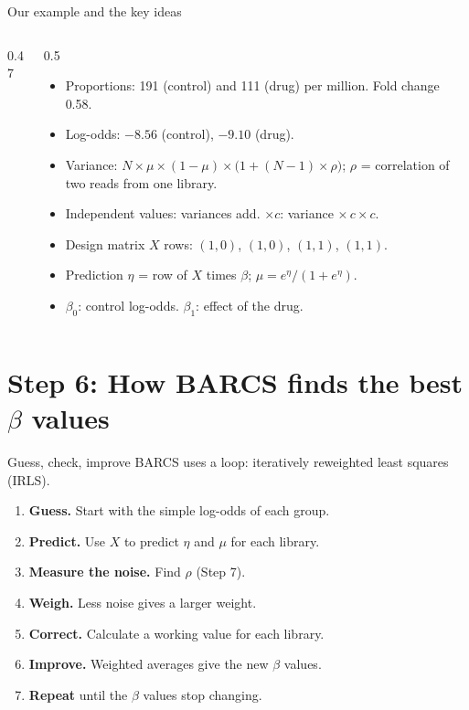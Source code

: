 \documentclass[aspectratio=169,11pt]{beamer}
\begin{document}
\begin{frame}{Our example and the key ideas}
\begin{columns}[T]
\begin{column}{0.47\textwidth}
\centering
\resizebox{\linewidth}{!}{\datatable}
\end{column}
\begin{column}{0.5\textwidth}
\footnotesize
\begin{itemize}
\item Proportions: 191 (control) and 111 (drug) per million. Fold change
  0.58.
\item Log-odds: $-8.56$ (control), $-9.10$ (drug).
\item Variance: $N \times \mu \times (1-\mu) \times \bigl(1 + (N-1) \times \rho\bigr)$;
  $\rho$ = correlation of two reads from one library.
\item Independent values: variances add. $\times c$: variance
  $\times\, c \times c$.
\item Design matrix $X$ rows: $(1,0)$, $(1,0)$, $(1,1)$, $(1,1)$.
\item Prediction $\eta$ = row of $X$ times $\beta$;
  $\mu = e^{\eta}/(1+e^{\eta})$.
\item $\beta_0$: control log-odds. $\beta_1$: effect of the drug.
\end{itemize}
\end{column}
\end{columns}
\end{frame}

\section{Step 6: How BARCS finds the best \texorpdfstring{$\beta$}{beta} values}

\begin{frame}{Guess, check, improve}
BARCS uses a loop: \alert{iteratively reweighted least squares} (IRLS).
\begin{enumerate}
\item \textbf{Guess.} Start with the simple log-odds of each group.
\item \textbf{Predict.} Use $X$ to predict $\eta$ and $\mu$ for each library.
\item \textbf{Measure the noise.} Find $\rho$ (Step 7).
\item \textbf{Weigh.} Less noise gives a larger \alert{weight}.
\item \textbf{Correct.} Calculate a \alert{working value} for each library.
\item \textbf{Improve.} Weighted averages give the new $\beta$ values.
\item \textbf{Repeat} until the $\beta$ values stop changing.
\end{enumerate}
\end{frame}
\end{document}
